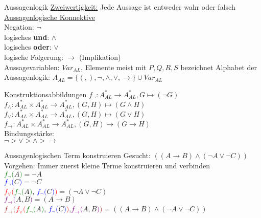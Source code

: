 \begin{frame}{Aussagenlogik}
 \underline{Zweiwertigkeit:} Jede Aussage ist entweder wahr oder falsch\\
 \underline{Aussagenlogische Konnektive}\\
 Negation: $\neg$\\
 logisches \textbf{und}: $\wedge$\\
 logisches \textbf{oder}: $\vee$\\
 logische Folgerung: $\rightarrow$ (Implikation)\\
 Aussagevariablen: $Var_{AL}$, Elemente meist mit $P, Q, R, S$ bezeichnet
 Alphabet der Aussagenlogik: $A_{AL}=\{(,),\neg,\wedge,\vee,\rightarrow\}\cup Var_{AL}$\\
\end{frame}

\begin{frame}{Konstruktionsabbildungen}
 $f_{\neg}: A^{\ast}_{AL}\longrightarrow A^{\ast}_{AL}, G\mapsto (\neg G)$\\
 $f_{\wedge}:A^{\ast}_{AL}\times A^{\ast}_{AL}\longrightarrow A^{\ast}_{AL}, (G, H)\mapsto (G\wedge H)$\\
 $f_{\vee}:A^{\ast}_{AL}\times A^{\ast}_{AL}\longrightarrow A^{\ast}_{AL}, (G, H)\mapsto (G\vee H)$\\
 $f_{\rightarrow}:A^{\ast}_{AL}\times A^{\ast}_{AL}\longrightarrow A^{\ast}_{AL}, (G, H)\mapsto (G\rightarrow H)$\\
 Bindungsstärke:\\
 $\neg>\vee>\wedge>\rightarrow$\\
\end{frame}

\begin{frame}{Aussagenlogischen Term konstruieren}
 Gesucht: $((A\rightarrow B)\wedge (\neg A\vee\neg C))$\\
 Vorgehen: Immer zuerst kleine Terme konstruieren und verbinden\\
 \textcolor{green}{$f_{\neg} ($}$A$\textcolor{green}{$)$}$ = \neg A$\\
 \textcolor{blue}{$f_{\neg}($}$C$\textcolor{blue}{$)$}$ = \neg C$\\
 \textcolor{red}{$f_{\vee}($}\textcolor{green}{$f_{\neg} ($}$A$\textcolor{green}{$)$}, \textcolor{blue}{$f_{\neg}($}$C$\textcolor{blue}{$)$}\textcolor{red}{$)$}$ = (\neg A\vee\neg C)$\\
 \textcolor{purple}{$f_{\rightarrow}($}$A,B$\textcolor{purple}{$)$}$ = (A\rightarrow B)$\\
 \textcolor{brown}{$f_{\rightarrow}($}\textcolor{red}{$f_{\vee}($}\textcolor{green}{$f_{\neg} ($}$A$\textcolor{green}{$)$}, \textcolor{blue}{$f_{\neg}($}$C$\textcolor{blue}{$)$}\textcolor{red}{$)$},\textcolor{purple}{$f_{\rightarrow}($}$A,B$\textcolor{purple}{$)$}\textcolor{brown}{$)$}$ = ((A\rightarrow B)\wedge (\neg A\vee\neg C))$\\
\end{frame}


